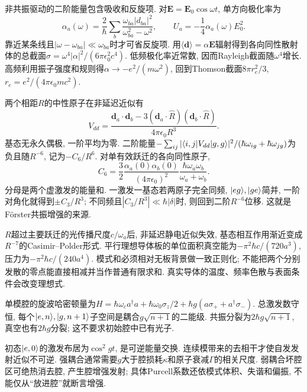 非共振驱动的二阶能量包含吸收和反旋项. 对$\mathbf E=\mathbf E_0\cos\omega t$, 单方向极化率为
\begin{equation}\alpha_a(\omega)=\frac2\hbar\sum_b\frac{\omega_{ba}|d_{ba}|^2}{\omega_{ba}^2-\omega^2},\qquad U_a=-\frac14\alpha_a(\omega)E_0^2.\label{eq:polar}\end{equation}
靠近某条线且$|\omega-\omega_{ba}|\ll\omega_{ba}$时才可省反旋项. 用$\langle\mathbf d\rangle=\alpha\mathbf E$辐射得到各向同性散射体的总截面$\sigma=\omega^4|\alpha|^2/(6\pi\epsilon_0^2c^4)$. 低频极化率近常数, 因而Rayleigh截面随$\omega^4$增长. 高频利用振子强度和规则得$\alpha\to-e^2/(m\omega^2)$, 回到Thomson截面$8\pi r_e^2/3$, $r_e=e^2/(4\pi\epsilon_0mc^2)$.

两个相距$R$的中性原子在非延迟近似有
\[V_{dd}=\frac{\mathbf d_a\cdot\mathbf d_b-3(\mathbf d_a\cdot\hat R)(\mathbf d_b\cdot\hat R)}{4\pi\epsilon_0R^3}.\]
基态无永久偶极, 一阶平均为零. 二阶能量$-\sum_{ij}|\langle i,j\rvert V_{dd}\lvert g,g\rangle|^2/(\hbar\omega_{ig}+\hbar\omega_{jg})$为负且随$R^{-6}$, 记为$-C_6/R^6$. 对单有效跃迁的各向同性原子,
\[C_6=\frac32\frac{\alpha_a(0)\alpha_b(0)}{(4\pi\epsilon_0)^2}\frac{\hbar\omega_a\omega_b}{\omega_a+\omega_b}.\]
分母是两个虚激发的能量和. 一激发一基态若两原子完全同频, $\lvert eg\rangle,\lvert ge\rangle$简并, 一阶对角化就得到$\pm C_3/R^3$; 不同频且$|C_3/R^3|\ll\hbar|\delta|$时, 则回到二阶$R^{-6}$位移. 这就是Förster共振增强的来源.

$R$超过主要跃迁的光传播尺度$c/\omega_a$后, 非延迟静电近似失效, 基态相互作用渐近变成$R^{-7}$的Casimir--Polder形式. 平行理想导体板的单位面积真空能为$-\pi^2\hbar c/(720a^3)$, 压力为$-\pi^2\hbar c/(240a^4)$. 模式和必须相对无板背景做一致正则化; 不能把两个分别发散的零点能直接相减并当作普通有限求和. 真实导体的温度、频率色散与表面条件会改变理想式.

单模腔的旋波哈密顿量为$H=\hbar\omega_ca^\dagger a+\hbar\omega_0\sigma_z/2+\hbar g(a\sigma_++a^\dagger\sigma_-)$. 总激发数守恒, 每个$\lvert e,n\rangle,\lvert g,n+1\rangle$子空间是耦合$g\sqrt{n+1}$的二能级. 共振分裂为$2\hbar g\sqrt{n+1}$, 真空也有$2\hbar g$分裂; 这不要求初始腔中已有光子.

初态$\lvert e,0\rangle$的激发布居为$\cos^2gt$, 是可逆能量交换. 连续模带来的去相干才使自发发射近似不可逆. 强耦合通常需要$g$大于腔损耗$\kappa$和原子衰减$\Gamma$的相关尺度. 弱耦合坏腔区可绝热消去腔, 产生腔增强发射; 具体Purcell系数还依模式体积、失谐和偏振, 不能仅从“放进腔”就断言增强.

